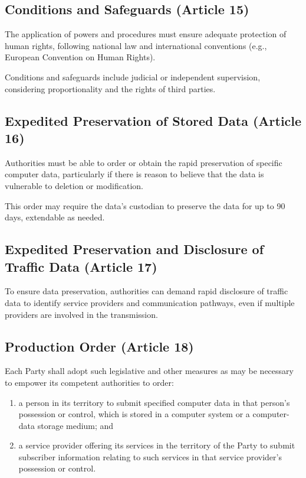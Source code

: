 \subsection{Conditions and Safeguards (Article 15)}
The application of powers and procedures must ensure adequate
protection of human rights, following national law and international
conventions (e.g., European Convention on Human Rights).

Conditions and safeguards include judicial or independent supervision,
considering proportionality and the rights of third parties.
\subsection{Expedited Preservation of Stored Data (Article 16)}
Authorities must be able to order or obtain the rapid preservation
of specific computer data, particularly if there is reason to believe
that the data is vulnerable to deletion or modification.

This order may require the data's custodian to preserve the data for
up to 90 days, extendable as needed.

\subsection{Expedited Preservation and Disclosure of Traffic Data
(Article 17)}
To ensure data preservation, authorities can demand rapid disclosure
of traffic data to identify service providers and communication
pathways, even if multiple providers are involved in the transmission.

\subsection{Production Order (Article 18)}
Each Party shall adopt such legislative and other measures as
may be necessary to empower its competent authorities to
order:
\begin{enumerate}
  \item a person in its territory to submit specified computer data in
    that person’s possession or control, which is stored in a computer
    system or a computer-data storage medium; and
  \item a service provider offering its services in the territory of the
    Party to submit subscriber information relating to such services in
    that service provider’s possession or control.
\end{enumerate}

